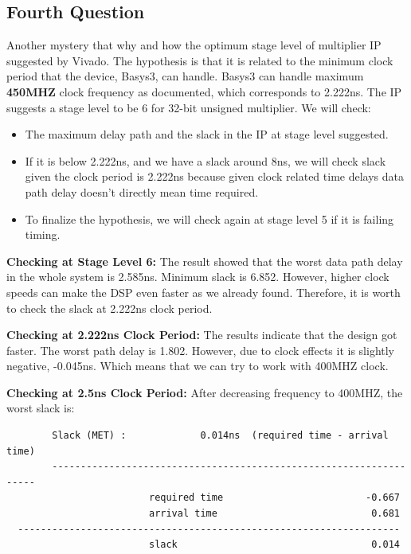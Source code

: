 \documentclass{report}
\begin{document}
\subsection{Fourth Question}
Another mystery that why and how the optimum stage level of multiplier IP suggested by Vivado. The hypothesis is that it is related to the minimum clock period that the device, Basys3, can handle. Basys3 can handle maximum \textbf{450MHZ} clock frequency as documented, which corresponds to 2.222ns. The IP suggests a stage level to be 6 for 32-bit unsigned multiplier. We will check:
\begin{itemize}
    \item The maximum delay path and the slack in the IP at stage level suggested.
    \item If it is below 2.222ns, and we have a slack around 8ns, we will check slack given the clock period is 2.222ns because given clock related time delays data path delay doesn't directly mean time required.
    \item To finalize the hypothesis, we will check again at stage level 5 if it is failing timing.
\end{itemize}

\textbf{Checking at Stage Level 6:}
The result showed that the worst data path delay in the whole system is 2.585ns. Minimum slack is 6.852. However, higher clock speeds can make the DSP  even faster as we already found. Therefore, it is worth to check the slack at 2.222ns clock period.

\textbf{Checking at 2.222ns Clock Period:}
The results indicate that the design got faster. The worst path delay is 1.802. However, due to clock effects it is slightly negative, -0.045ns. Which means that we can try to work with 400MHZ clock.

\textbf{Checking at 2.5ns Clock Period:}
After decreasing frequency to 400MHZ, the worst slack is:
\begin{verbatim}
        Slack (MET) :             0.014ns  (required time - arrival time)
        -------------------------------------------------------------------
                         required time                         -0.667    
                         arrival time                           0.681    
  -------------------------------------------------------------------
                         slack                                  0.014    
\end{verbatim}
\end{document}
